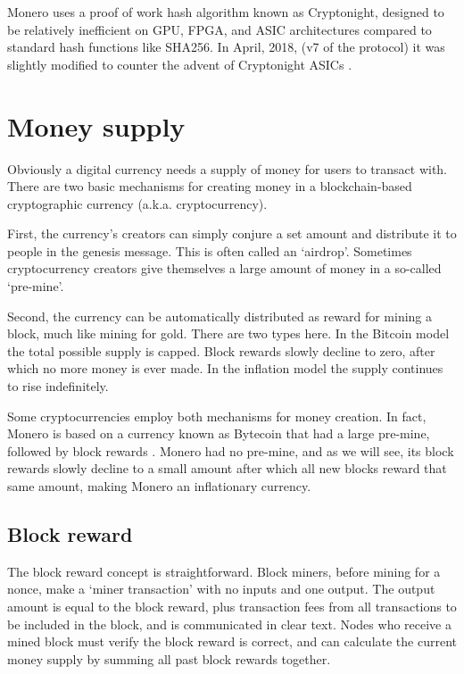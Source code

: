 Monero uses a proof of work hash algorithm known as Cryptonight, designed to be relatively inefficient on GPU, FPGA, and ASIC architectures \cite{CryptoNight} compared to standard hash functions like SHA256. In April, 2018, (v7 of the protocol) it was slightly modified to counter the advent of Cryptonight ASICs \cite{cryptonight7}.



\section{Money supply}
\label{sec:money-supply}

Obviously a digital currency needs a supply of money for users to transact with. There are two basic mechanisms for creating money in a blockchain-based cryptographic currency (a.k.a. cryptocurrency).

First, the currency's creators can simply conjure a set amount and distribute it to people in the genesis message. This is often called an `airdrop'. Sometimes cryptocurrency creators give themselves a large amount of money in a so-called `pre-mine'. \cite{premine-description}

Second, the currency can be automatically distributed as reward for mining a block, much like mining for gold. There are two types here. In the Bitcoin model the total possible supply is capped. Block rewards slowly decline to zero, after which no more money is ever made. In the inflation model the supply continues to rise indefinitely. 

Some cryptocurrencies employ both mechanisms for money creation. In fact, Monero is based on a currency known as Bytecoin that had a large pre-mine, followed by block rewards \cite{monero-history}. Monero had no pre-mine, and as we will see, its block rewards slowly decline to a small amount after which all new blocks reward that same amount, making Monero an inflationary currency.


\subsection{Block reward}
\label{subsec:block-reward} %

The block reward concept is straightforward. Block miners, before mining for a nonce, make a `miner transaction' with no inputs and one output. The output amount is equal to the block reward, plus transaction fees from all transactions to be included in the block, and is communicated in clear text. Nodes who receive a mined block must verify the block reward is correct, and can calculate the current money supply by summing all past block rewards together.

